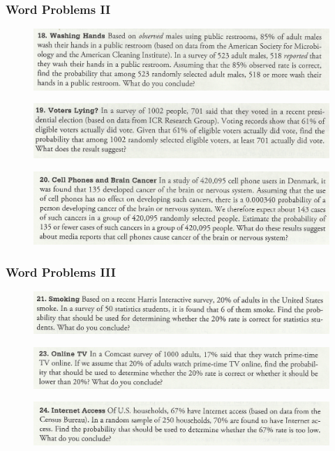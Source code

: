 \documentclass[xcolor=dvipsnames]{beamer}
\begin{document}
\begin{frame}
  \frametitle{Word Problems II}
  \begin{figure}[h]
    \includegraphics[scale=.7]{./diagrams/triola1.png}
  \end{figure}
  \begin{figure}[h]
    \includegraphics[scale=.7]{./diagrams/triola2.png}
  \end{figure}
  \begin{figure}[h]
    \includegraphics[scale=.7]{./diagrams/triola3.png}
  \end{figure}
\end{frame}

\begin{frame}
  \frametitle{Word Problems III}
  \begin{figure}[h]
    \includegraphics[scale=.7]{./diagrams/triola4.png}
  \end{figure}
  \begin{figure}[h]
    \includegraphics[scale=.7]{./diagrams/triola5.png}
  \end{figure}
  \begin{figure}[h]
    \includegraphics[scale=.7]{./diagrams/triola6.png}
  \end{figure}
\end{frame}
\end{document}

